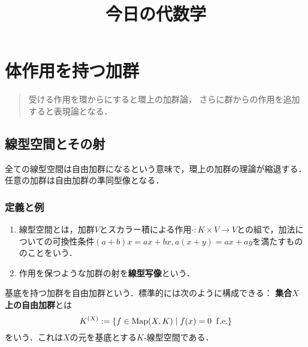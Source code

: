 \documentclass[uplatex,dvipdfmx]{jsreport}
\title{今日の代数学}
\author{}
\begin{document}
\tableofcontents

\chapter{体作用を持つ加群}

\begin{quotation}
    受ける作用を環からにすると環上の加群論，
    さらに群からの作用を追加すると表現論となる．
\end{quotation}

\section{線型空間とその射}

\begin{tcolorbox}[colframe=ForestGreen, colback=ForestGreen!10!white,breakable,colbacktitle=ForestGreen!40!white,coltitle=black,fonttitle=\bfseries\sffamily,
title=]
    全ての線型空間は自由加群になるという意味で，環上の加群の理論が縮退する．
    任意の加群は自由加群の準同型像となる．
\end{tcolorbox}

\subsection{定義と例}

\begin{definition}\mbox{}
    \begin{enumerate}
        \item 線型空間とは，加群$V$とスカラー積による作用$\cdot:K\times V\to V$との組で，加法についての可換性条件$(a+b)x=ax+bx,a(x+y)=ax+ay$を満たすもののことをいう．
        \item 作用を保つような加群の射を\textbf{線型写像}という．
    \end{enumerate}
\end{definition}

\begin{example}
    基底を持つ加群を自由加群という．標準的には次のように構成できる：
    \textbf{集合$X$上の自由加群}とは
    \[K^{(X)}:=\left\{f\in\mathrm{Map}(X,K)\mid f(x)=0\;\;\mathrm{f.e.}\right\}\]
    をいう．これは$X$の元を基底とする$K$-線型空間である．
\end{example}
\end{document}
